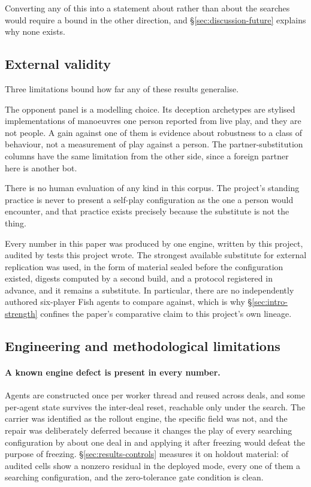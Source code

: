 Converting any of this into a statement about \sestina{} rather than about the searches would
require a bound in the other direction, and \S\ref{sec:discussion-future} explains why none exists.

\subsection{External validity}
\label{sec:discussion-external}

Three limitations bound how far any of these results generalise.

The opponent panel is a modelling choice. Its deception archetypes are stylised implementations of
manoeuvres one person reported from live play, and they are not people. A gain against one of them is
evidence about robustness to a class of behaviour, not a measurement of play against a person. The
partner-substitution columns have the same limitation from the other side, since a foreign partner
here is another bot.

There is no human evaluation of any kind in this corpus. The project's standing practice is never to
present a self-play configuration as the one a person would encounter, and that practice exists
precisely because the substitute is not the thing.

Every number in this paper was produced by one engine, written by this project, audited by tests this
project wrote. The strongest available substitute for external replication was used, in the form of
material sealed before the configuration existed, digests computed by a second build, and a protocol
registered in advance, and it remains a substitute. In particular, there are no independently authored
six-player Fish agents to compare against, which is why \S\ref{sec:intro-strength} confines the
paper's comparative claim to this project's own lineage.

\subsection{Engineering and methodological limitations}
\label{sec:discussion-engineering}

\paragraph{A known engine defect is present in every number.} Agents are constructed once per worker
thread and reused across deals, and some per-agent state survives the inter-deal reset, reachable only
under the search. The carrier was identified as the rollout engine, the specific field was not, and
the repair was deliberately deferred because it changes the play of every searching configuration by
about one deal in \vsevenSsixIncidence{} and applying it after freezing would defeat the purpose of
freezing. \S\ref{sec:results-controls} measures it on holdout material:
\vsevenSsixPlainNonzero{} of \vsevenSsixCells{} audited cells show a nonzero residual in the deployed
mode, every one of them a searching configuration, and the zero-tolerance gate condition is clean.

